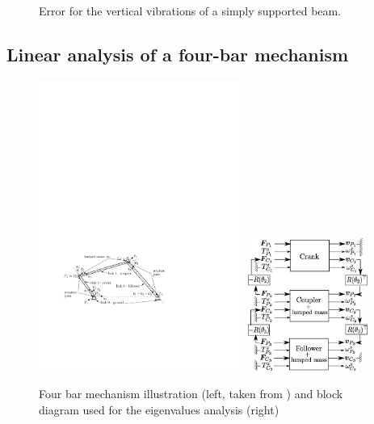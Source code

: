 \documentclass{svjour3}                     %
\begin{document}
{\begin{figure}[tbh]
			\hspace{8pt}%
			 \\
			\caption{Error for the vertical vibrations of a simply supported beam.}%
			\label{fig:errorHerDG1}%
		\end{figure}
	}
	
	
	\subsection{Linear analysis of a four-bar mechanism}
	
	\begin{figure}[tb]
		\centering
		\includegraphics[width=0.6\textwidth]{fourbars.pdf} 
		\includegraphics[width=0.35\textwidth]{block_4bars.eps} 
		\caption{Four bar mechanism illustration (left, taken from \cite{Chebbi2017}) and block diagram used for the eigenvalues analysis (right)}
		\label{fig:4bars}
	\end{figure}
	
\end{document}
